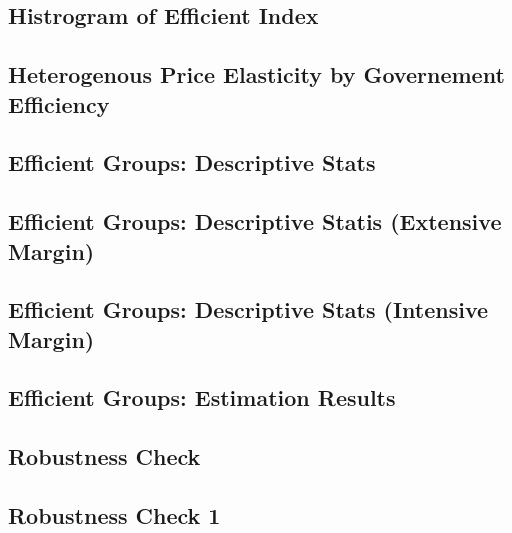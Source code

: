\documentclass[ review  , 3p ]{elsarticle}
\begin{document}
  \hypertarget{histrogram-of-efficient-index}{%
  \subsection{Histrogram of Efficient Index}\label{histrogram-of-efficient-index}}
  
  \hypertarget{heterogenous-price-elasticity-by-governement-efficiency}{%
  \subsection{Heterogenous Price Elasticity by Governement Efficiency}\label{heterogenous-price-elasticity-by-governement-efficiency}}
  
  \hypertarget{efficient-groups-descriptive-stats}{%
  \subsection{Efficient Groups: Descriptive Stats}\label{efficient-groups-descriptive-stats}}
  
  \hypertarget{efficient-groups-descriptive-statis-extensive-margin}{%
  \subsection{Efficient Groups: Descriptive Statis (Extensive Margin)}\label{efficient-groups-descriptive-statis-extensive-margin}}
  
  \hypertarget{efficient-groups-descriptive-stats-intensive-margin}{%
  \subsection{Efficient Groups: Descriptive Stats (Intensive Margin)}\label{efficient-groups-descriptive-stats-intensive-margin}}
  
  \hypertarget{efficient-groups-estimation-results}{%
  \subsection{Efficient Groups: Estimation Results}\label{efficient-groups-estimation-results}}
  
  \hypertarget{robustness-check-1}{%
  \subsection{Robustness Check}\label{robustness-check-1}}
  
  \hypertarget{robustness-check-1-1}{%
  \subsection{Robustness Check 1}\label{robustness-check-1-1}}
  
\end{document}
